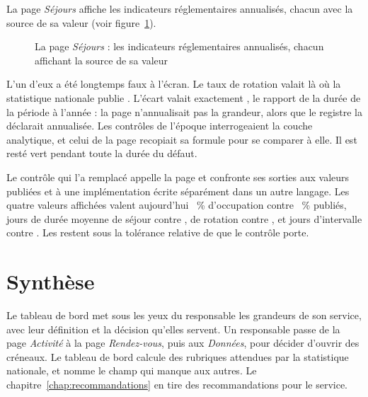 La page \emph{Séjours} affiche les  indicateurs réglementaires annualisés, chacun avec la
source de sa valeur (voir figure~\ref{fig:tdb-sejours}).

\begin{figure}[htbp]
\centering
{}
\caption[La page Séjours du tableau de bord]{La page \emph{Séjours} : les indicateurs réglementaires annualisés, chacun affichant la source de sa valeur}\label{fig:tdb-sejours}
\end{figure}

L'un d'eux a été longtemps faux à l'écran. Le taux de rotation valait
 là où la statistique nationale publie . L'écart
valait exactement , le rapport de la durée de la période à l'année :
la page n'annualisait pas la grandeur, alors que le registre la déclarait annualisée. Les contrôles
de l'époque interrogeaient la couche analytique, et celui de la page recopiait sa formule pour se
comparer à elle. Il est resté vert pendant toute la durée du défaut.

Le contrôle qui l'a remplacé appelle la page et confronte ses sorties aux valeurs publiées et à une
implémentation écrite séparément dans un autre langage. Les quatre valeurs affichées valent
aujourd'hui ~\% d'occupation contre ~\% publiés,
 jours de durée moyenne de séjour contre ,
 de rotation contre , et  jours
d'intervalle contre . Les  restent sous la tolérance relative de
 que le contrôle porte.

\section*{Synthèse}

Le tableau de bord met sous les yeux du responsable les grandeurs de son service, avec leur
définition et la décision qu'elles servent. Un responsable passe de la page \emph{Activité} à la
page \emph{Rendez-vous}, puis aux \emph{Données}, pour décider d'ouvrir des créneaux. Le tableau de
bord calcule  des  rubriques attendues
par la statistique nationale, et nomme le champ qui manque aux autres. Le
chapitre~\ref{chap:recommandations} en tire des recommandations pour le service.
